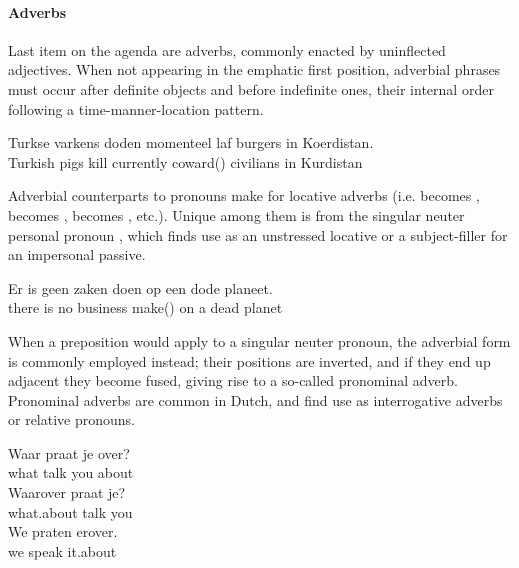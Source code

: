 \paragraph{Adverbs}
Last item on the agenda are adverbs, commonly enacted by uninflected adjectives.
When not appearing in the emphatic first position, adverbial phrases must occur after definite objects and before indefinite ones, their internal order following a time-manner-location pattern.
\begin{exe}
\ex
\gll Turkse varkens doden momenteel laf burgers in Koerdistan.\\
Turkish pigs kill currently coward() civilians in Kurdistan\\
\end{exe}
Adverbial counterparts to pronouns make for locative adverbs (i.e.  becomes ,  becomes ,  becomes , etc.). 
Unique among them is  from the singular neuter personal pronoun , which finds use as an unstressed locative or a subject-filler for an impersonal passive.
\begin{exe}
\ex
\gll Er is geen zaken doen op een dode planeet.\\
there is no business make() on a dead planet\\
\end{exe}
When a preposition would apply to a singular neuter pronoun, the adverbial form is commonly employed instead; their positions are inverted, and if they end up adjacent they become fused, giving rise to a so-called  pronominal adverb.
Pronominal adverbs are common in Dutch, and find use as interrogative adverbs or relative pronouns.
\begin{exe}
\ex
\begin{xlist}
\ex
\gll Waar praat je over?\\
what talk you about\\
\ex
\gll Waarover praat je?\\
what.about talk you\\
\ex
\gll We praten erover.\\
we speak it.about\\
\end{xlist}
\end{exe}


